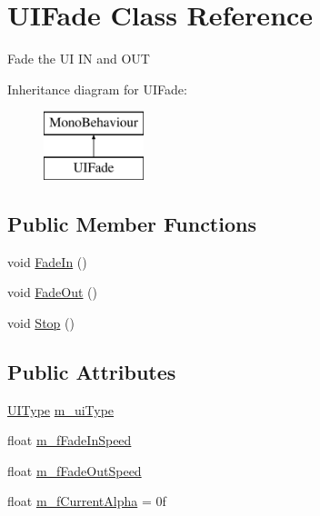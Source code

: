 \hypertarget{class_u_i_fade}{}\section{U\+I\+Fade Class Reference}
\label{class_u_i_fade}


Fade the UI IN and O\+UT  


Inheritance diagram for U\+I\+Fade\+:\begin{figure}[H]
\begin{center}
\leavevmode
\includegraphics[height=2.000000cm]{class_u_i_fade}
\end{center}
\end{figure}
\subsection*{Public Member Functions}
\begin{DoxyCompactItemize}
\item 
void \mbox{\hyperlink{class_u_i_fade_ad9991d96579a20faaa7a93c50d5f38e1}{Fade\+In}} ()
\item 
void \mbox{\hyperlink{class_u_i_fade_ae98897fd279c593f1dfea85829752c62}{Fade\+Out}} ()
\item 
void \mbox{\hyperlink{class_u_i_fade_a6282aba084e3275d93fbe910e32a9e49}{Stop}} ()
\end{DoxyCompactItemize}
\subsection*{Public Attributes}
\begin{DoxyCompactItemize}
\item 
\mbox{\hyperlink{_u_i_fade_8cs_a9b4722689fa1a28f5f7e8f96c580efbe}{U\+I\+Type}} \mbox{\hyperlink{class_u_i_fade_a93a4a9d4c461da081d961a5f37974542}{m\+\_\+ui\+Type}}
\item 
float \mbox{\hyperlink{class_u_i_fade_a9483c442d2c58cda7abb505d3aeb2df3}{m\+\_\+f\+Fade\+In\+Speed}}
\item 
float \mbox{\hyperlink{class_u_i_fade_a72d782f270de64c0ae8d1fc9ca9146ef}{m\+\_\+f\+Fade\+Out\+Speed}}
\item 
float \mbox{\hyperlink{class_u_i_fade_a3b8a8c498846352f695fa84901dc47a7}{m\+\_\+f\+Current\+Alpha}} = 0f
\end{DoxyCompactItemize}



